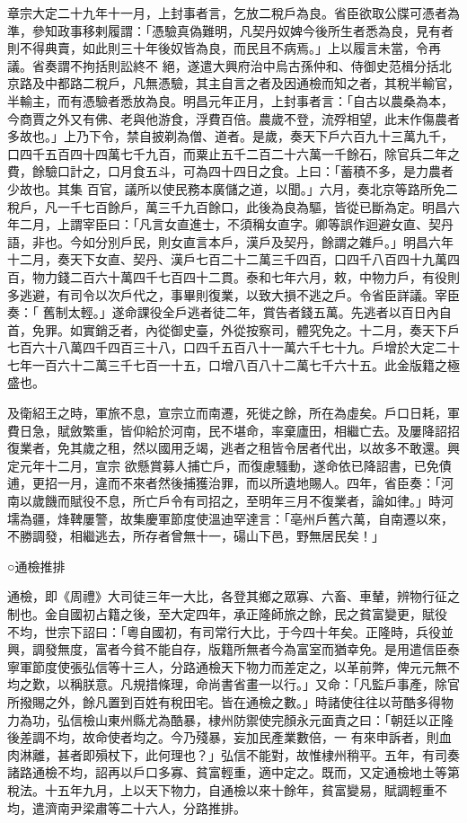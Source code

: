 \begin{pinyinscope}
 章宗大定二十九年十一月，上封事者言，乞放二稅戶為良。省臣欲取公牒可憑者為準，參知政事移剌履謂：「憑驗真偽難明，凡契丹奴婢今後所生者悉為良，見有者則不得典賣，如此則三十年後奴皆為良，而民且不病焉。」上以履言未當，令再議。省奏謂不拘括則訟終不
 絕，遂遣大興府治中烏古孫仲和、侍御史范楫分括北京路及中都路二稅戶，凡無憑驗，其主自言之者及因通檢而知之者，其稅半輸官，半輸主，而有憑驗者悉放為良。明昌元年正月，上封事者言：「自古以農桑為本，今商賈之外又有佛、老與他游食，浮費百倍。農歲不登，流殍相望，此末作傷農者多故也。」上乃下令，禁自披剃為僧、道者。是歲，奏天下戶六百九十三萬九千，口四千五百四十四萬七千九百，而粟止五千二百二十六萬一千餘石，除官兵二年之費，餘驗口計之，口月食五斗，可為四十四日之食。上曰：「蓄積不多，是力農者少故也。其集
 百官，議所以使民務本廣儲之道，以聞。」六月，奏北京等路所免二稅戶，凡一千七百餘戶，萬三千九百餘口，此後為良為驅，皆從已斷為定。明昌六年二月，上謂宰臣曰：「凡言女直進士，不須稱女直字。卿等誤作迴避女直、契丹語，非也。今如分別戶民，則女直言本戶，漢戶及契丹，餘謂之雜戶。」明昌六年十二月，奏天下女直、契丹、漢戶七百二十二萬三千四百，口四千八百四十九萬四百，物力錢二百六十萬四千七百四十二貫。泰和七年六月，敕，中物力戶，有役則多逃避，有司令以次戶代之，事畢則復業，以致大損不逃之戶。令省臣詳議。宰臣奏：「
 舊制太輕。」遂命課役全戶逃者徒二年，賞告者錢五萬。先逃者以百日內自首，免罪。如實銷乏者，內從御史臺，外從按察司，體究免之。十二月，奏天下戶七百六十八萬四千四百三十八，口四千五百八十一萬六千七十九。戶增於大定二十七年一百六十二萬三千七百一十五，口增八百八十二萬七千六十五。此金版籍之極盛也。



 及衛紹王之時，軍旅不息，宣宗立而南遷，死徙之餘，所在為虛矣。戶口日耗，軍費日急，賦斂繁重，皆仰給於河南，民不堪命，率棄廬田，相繼亡去。及屢降詔招復業者，免其歲之租，然以國用乏竭，逃者之租皆令居者代出，以故多不敢還。興定元年十二月，宣宗
 欲懸賞募人捕亡戶，而復慮騷動，遂命依已降詔書，已免債逋，更招一月，違而不來者然後捕獲治罪，而以所遺地賜人。四年，省臣奏：「河南以歲饑而賦役不息，所亡戶令有司招之，至明年三月不復業者，論如律。」時河壖為疆，烽鞞屢警，故集慶軍節度使溫迪罕達言：「亳州戶舊六萬，自南遷以來，不勝調發，相繼逃去，所存者曾無十一，碭山下邑，野無居民矣！」



 ○通檢推排



 通檢，即《周禮》大司徒三年一大比，各登其鄉之眾寡、六畜、車輦，辨物行征之制也。金自國初占籍之後，至大定四年，承正隆師旅之餘，民之貧富變更，賦役
 不均，世宗下詔曰：「粵自國初，有司常行大比，于今四十年矣。正隆時，兵役並興，調發無度，富者今貧不能自存，版籍所無者今為富室而猶幸免。是用遣信臣泰寧軍節度使張弘信等十三人，分路通檢天下物力而差定之，以革前弊，俾元元無不均之歎，以稱朕意。凡規措條理，命尚書省畫一以行。」又命：「凡監戶事產，除官所撥賜之外，餘凡置到百姓有稅田宅。皆在通檢之數。」時諸使往往以苛酷多得物力為功，弘信檢山東州縣尤為酷暴，棣州防禦使完顏永元面責之曰：「朝廷以正隆後差調不均，故命使者均之。今乃殘暴，妄加民產業數倍，一
 有來申訴者，則血肉淋離，甚者即殞杖下，此何理也？」弘信不能對，故惟棣州稍平。五年，有司奏諸路通檢不均，詔再以戶口多寡、貧富輕重，適中定之。既而，又定通檢地土等第稅法。十五年九月，上以天下物力，自通檢以來十餘年，貧富變易，賦調輕重不均，遣濟南尹梁肅等二十六人，分路推排。




\end{pinyinscope}
